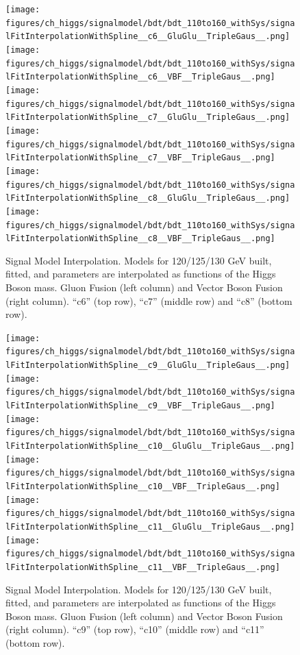 \begin{figure}[htbp]
  \centering
  \texttt{[image: figures/ch\_higgs/signalmodel/bdt/bdt\_110to160\_withSys/signalFitInterpolationWithSpline\_\_c6\_\_GluGlu\_\_TripleGaus\_\_.png]}
  \texttt{[image: figures/ch\_higgs/signalmodel/bdt/bdt\_110to160\_withSys/signalFitInterpolationWithSpline\_\_c6\_\_VBF\_\_TripleGaus\_\_.png]}\\
  \texttt{[image: figures/ch\_higgs/signalmodel/bdt/bdt\_110to160\_withSys/signalFitInterpolationWithSpline\_\_c7\_\_GluGlu\_\_TripleGaus\_\_.png]}
  \texttt{[image: figures/ch\_higgs/signalmodel/bdt/bdt\_110to160\_withSys/signalFitInterpolationWithSpline\_\_c7\_\_VBF\_\_TripleGaus\_\_.png]}\\
  \texttt{[image: figures/ch\_higgs/signalmodel/bdt/bdt\_110to160\_withSys/signalFitInterpolationWithSpline\_\_c8\_\_GluGlu\_\_TripleGaus\_\_.png]}
  \texttt{[image: figures/ch\_higgs/signalmodel/bdt/bdt\_110to160\_withSys/signalFitInterpolationWithSpline\_\_c8\_\_VBF\_\_TripleGaus\_\_.png]}
  \caption{Signal Model Interpolation. Models for 120/125/130 GeV built, fitted, and parameters are interpolated as functions of the Higgs Boson mass. Gluon Fusion (left column) and Vector Boson Fusion (right column). ``c6'' (top row), ``c7'' (middle row) and ``c8'' (bottom row).}
  \label{fig:higgs_signalmodel_gluvbfc6c8}
\end{figure}
\begin{figure}[htbp]
  \centering
  \texttt{[image: figures/ch\_higgs/signalmodel/bdt/bdt\_110to160\_withSys/signalFitInterpolationWithSpline\_\_c9\_\_GluGlu\_\_TripleGaus\_\_.png]}
  \texttt{[image: figures/ch\_higgs/signalmodel/bdt/bdt\_110to160\_withSys/signalFitInterpolationWithSpline\_\_c9\_\_VBF\_\_TripleGaus\_\_.png]}\\
  \texttt{[image: figures/ch\_higgs/signalmodel/bdt/bdt\_110to160\_withSys/signalFitInterpolationWithSpline\_\_c10\_\_GluGlu\_\_TripleGaus\_\_.png]}
  \texttt{[image: figures/ch\_higgs/signalmodel/bdt/bdt\_110to160\_withSys/signalFitInterpolationWithSpline\_\_c10\_\_VBF\_\_TripleGaus\_\_.png]}\\
  \texttt{[image: figures/ch\_higgs/signalmodel/bdt/bdt\_110to160\_withSys/signalFitInterpolationWithSpline\_\_c11\_\_GluGlu\_\_TripleGaus\_\_.png]}
  \texttt{[image: figures/ch\_higgs/signalmodel/bdt/bdt\_110to160\_withSys/signalFitInterpolationWithSpline\_\_c11\_\_VBF\_\_TripleGaus\_\_.png]}
  \caption{Signal Model Interpolation. Models for 120/125/130 GeV built, fitted, and parameters are interpolated as functions of the Higgs Boson mass. Gluon Fusion (left column) and Vector Boson Fusion (right column). ``c9'' (top row), ``c10'' (middle row) and ``c11'' (bottom row).}
  \label{fig:higgs_signalmodel_gluvbfc9c11}
\end{figure}

